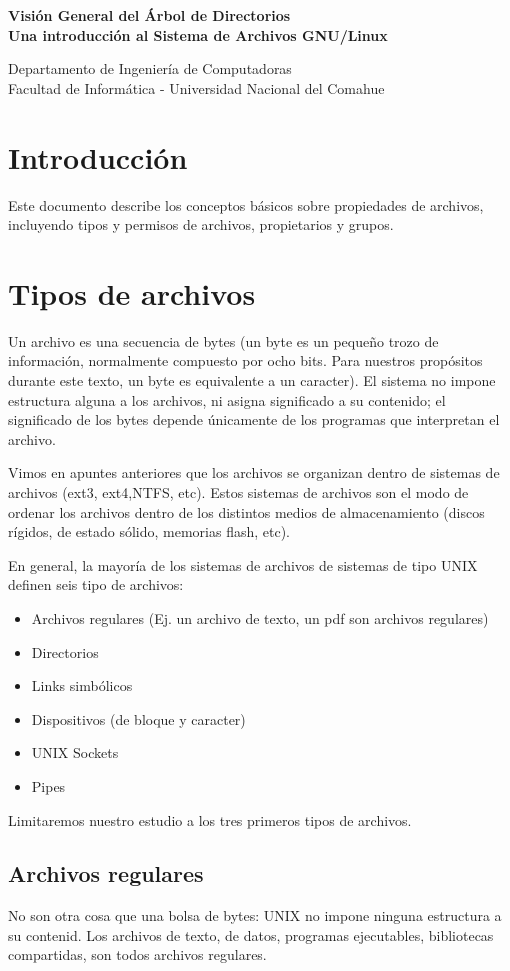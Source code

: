 \documentclass[12pt]{article}
\def\maketitle{

 \makeatletter
 {\color{bl} \centering \huge \sc \textbf{
Visión General del Árbol de Directorios \\
\large \vspace*{-8pt} \color{black} Una introducción al Sistema de Archivos GNU/Linux
 \vspace*{8pt} }\par}
 \makeatother


 \makeatletter
 {\centering \small 
 	Departamento de Ingeniería de Computadoras \\
 	Facultad de Informática - Universidad Nacional del Comahue \\
 	\vspace{20pt} }
 \makeatother

}
\begin{document}
\thispagestyle{empty}
\maketitle
\setlength{\parindent}{0pt}


\section{ Introducción}
Este documento describe los conceptos básicos sobre propiedades de archivos, 
incluyendo tipos y permisos de archivos, propietarios y grupos. 

\section*{Tipos de archivos}

Un archivo es una secuencia de bytes (un byte es un pequeño trozo de 
información, normalmente compuesto por ocho bits. Para nuestros propósitos
durante este texto, un byte es equivalente a un caracter). El sistema no impone 
estructura alguna a los archivos, ni asigna significado a su contenido; el 
significado de los bytes depende únicamente de los programas que 
interpretan el archivo. 

Vimos en apuntes anteriores que los archivos se organizan dentro de sistemas de 
archivos (ext3, ext4,NTFS, etc). Estos sistemas de archivos son el modo de 
ordenar los archivos dentro de los distintos medios de almacenamiento (discos
rígidos, de estado sólido, memorias flash, etc). 

En general, la mayoría de los sistemas de archivos de sistemas de tipo UNIX
definen seis tipo de archivos:

\begin{itemize}
\item Archivos regulares (Ej. un archivo de texto, un pdf son archivos regulares)
\item Directorios
\item Links simbólicos
\item Dispositivos (de bloque y caracter) 
\item UNIX Sockets  
\item Pipes 
\end{itemize}

Limitaremos nuestro estudio a los tres primeros tipos de archivos. 


\subsection*{Archivos regulares}
No son otra cosa que una bolsa de bytes: UNIX no impone ninguna estructura a
su contenid. Los archivos de texto, de datos, programas ejecutables, bibliotecas
compartidas, son todos archivos regulares.
\end{document}
